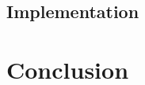 \documentclass[conference,onecolumn]{IEEEtran}
\begin{document}
  \subsection{Implementation}
  \label{subsec:implementation}


  \section{Conclusion}



  \printbibliography


\end{document}
